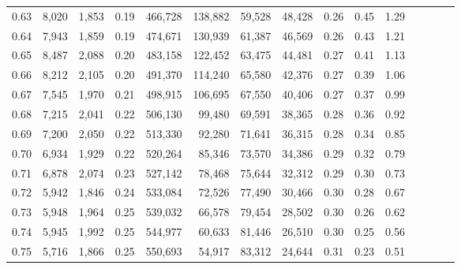 \begin{tabular}{rrrcrrrrrrrrrrr}
0.63 &   8,020 &  1,853 &                                       0.19 &  466,728 &  138,882 &   59,528 &   48,428 &  0.26 &  0.45 &                         1.29 \\
0.64 &   7,943 &  1,859 &                                       0.19 &  474,671 &  130,939 &   61,387 &   46,569 &  0.26 &  0.43 &                         1.21 \\
0.65 &   8,487 &  2,088 &                                       0.20 &  483,158 &  122,452 &   63,475 &   44,481 &  0.27 &  0.41 &                         1.13 \\
0.66 &   8,212 &  2,105 &                                       0.20 &  491,370 &  114,240 &   65,580 &   42,376 &  0.27 &  0.39 &                         1.06 \\
0.67 &   7,545 &  1,970 &                                       0.21 &  498,915 &  106,695 &   67,550 &   40,406 &  0.27 &  0.37 &                         0.99 \\
0.68 &   7,215 &  2,041 &                                       0.22 &  506,130 &   99,480 &   69,591 &   38,365 &  0.28 &  0.36 &                         0.92 \\
0.69 &   7,200 &  2,050 &                                       0.22 &  513,330 &   92,280 &   71,641 &   36,315 &  0.28 &  0.34 &                         0.85 \\
0.70 &   6,934 &  1,929 &                                       0.22 &  520,264 &   85,346 &   73,570 &   34,386 &  0.29 &  0.32 &                         0.79 \\
0.71 &   6,878 &  2,074 &                                       0.23 &  527,142 &   78,468 &   75,644 &   32,312 &  0.29 &  0.30 &                         0.73 \\
0.72 &   5,942 &  1,846 &                                       0.24 &  533,084 &   72,526 &   77,490 &   30,466 &  0.30 &  0.28 &                         0.67 \\
0.73 &   5,948 &  1,964 &                                       0.25 &  539,032 &   66,578 &   79,454 &   28,502 &  0.30 &  0.26 &                         0.62 \\
0.74 &   5,945 &  1,992 &                                       0.25 &  544,977 &   60,633 &   81,446 &   26,510 &  0.30 &  0.25 &                         0.56 \\
0.75 &   5,716 &  1,866 &                                       0.25 &  550,693 &   54,917 &   83,312 &   24,644 &  0.31 &  0.23 &                         0.51 \\

\end{tabular}
